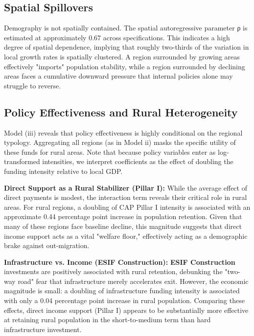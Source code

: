 \documentclass[
	a4paper, %
	10pt, %
]{LTJournalArticle}
\begin{document}


\subsection{Spatial Spillovers}

Demography is not spatially contained. The spatial autoregressive parameter ρ is estimated at approximately 0.67 across specifications. This indicates a high degree of spatial dependence, implying that roughly two-thirds of the variation in local growth rates is spatially clustered. A region surrounded by growing areas effectively "imports" population stability, while a region surrounded by declining areas faces a cumulative downward pressure that internal policies alone may struggle to reverse.

\subsection{Policy Effectiveness and Rural Heterogeneity}

Model (iii) reveals that policy effectiveness is highly conditional on the regional typology. Aggregating all regions (as in Model ii) masks the specific utility of these funds for rural areas. Note that because policy variables enter as log-transformed intensities, we interpret coefficients as the effect of doubling the funding intensity relative to local GDP.

\textbf{Direct Support as a Rural Stabilizer (Pillar I):} While the average effect of direct payments is modest, the interaction term reveals their critical role in rural areas. For rural regions, a doubling of CAP Pillar I intensity is associated with an approximate 0.44 percentage point increase in population retention. Given that many of these regions face baseline decline, this magnitude suggests that direct income support acts as a vital "welfare floor," effectively acting as a demographic brake against out-migration.

\textbf{Infrastructure vs. Income (ESIF Construction):} \textbf{ESIF Construction} investments are positively associated with rural retention, debunking the "two-way road" fear that infrastructure merely accelerates exit. However, the economic magnitude is small: a doubling of infrastructure funding intensity is associated with only a 0.04 percentage point increase in rural population. Comparing these effects, direct income support (Pillar I) appears to be substantially more effective at retaining rural population in the short-to-medium term than hard infrastructure investment.
\end{document}
